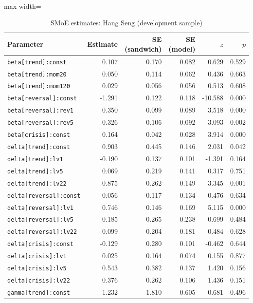 \begin{table}[!htbp]\centering\scriptsize
\caption{SMoE estimates: Hang Seng (development sample)}\label{tab:params_hsi}
\begin{adjustbox}{max width=\textwidth}
\begin{tabular}{lrrrrr}
\toprule
Parameter & Estimate & SE (sandwich) & SE (model) & $z$ & $p$\\
\midrule
\texttt{beta[trend]:const} & 0.107 & 0.170 & 0.082 & 0.629 & 0.529\\
\texttt{beta[trend]:mom20} & 0.050 & 0.114 & 0.062 & 0.436 & 0.663\\
\texttt{beta[trend]:mom120} & 0.029 & 0.056 & 0.056 & 0.513 & 0.608\\
\texttt{beta[reversal]:const} & -1.291 & 0.122 & 0.118 & -10.588 & 0.000\\
\texttt{beta[reversal]:rev1} & 0.350 & 0.099 & 0.089 & 3.518 & 0.000\\
\texttt{beta[reversal]:rev5} & 0.326 & 0.106 & 0.092 & 3.093 & 0.002\\
\texttt{beta[crisis]:const} & 0.164 & 0.042 & 0.028 & 3.914 & 0.000\\
\texttt{delta[trend]:const} & 0.903 & 0.445 & 0.146 & 2.031 & 0.042\\
\texttt{delta[trend]:lv1} & -0.190 & 0.137 & 0.101 & -1.391 & 0.164\\
\texttt{delta[trend]:lv5} & 0.069 & 0.219 & 0.141 & 0.317 & 0.751\\
\texttt{delta[trend]:lv22} & 0.875 & 0.262 & 0.149 & 3.345 & 0.001\\
\texttt{delta[reversal]:const} & 0.056 & 0.117 & 0.134 & 0.476 & 0.634\\
\texttt{delta[reversal]:lv1} & 0.746 & 0.146 & 0.169 & 5.115 & 0.000\\
\texttt{delta[reversal]:lv5} & 0.185 & 0.265 & 0.238 & 0.699 & 0.484\\
\texttt{delta[reversal]:lv22} & 0.099 & 0.204 & 0.181 & 0.484 & 0.628\\
\texttt{delta[crisis]:const} & -0.129 & 0.280 & 0.101 & -0.462 & 0.644\\
\texttt{delta[crisis]:lv1} & 0.025 & 0.164 & 0.074 & 0.155 & 0.877\\
\texttt{delta[crisis]:lv5} & 0.543 & 0.382 & 0.137 & 1.420 & 0.156\\
\texttt{delta[crisis]:lv22} & 0.376 & 0.262 & 0.106 & 1.436 & 0.151\\
\texttt{gamma[trend]:const} & -1.232 & 1.810 & 0.605 & -0.681 & 0.496\\

\end{tabular}
\end{adjustbox}
\end{table}
